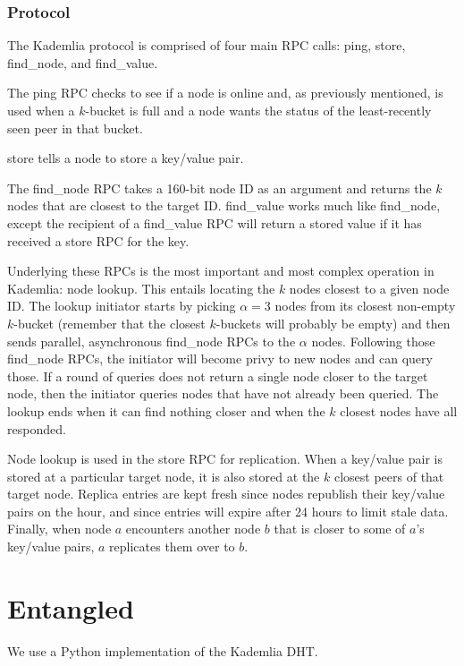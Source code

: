 \documentclass[12pt,twocolumn]{article}
\begin{document}
\subsubsection{Protocol}
\newcommand{\findNode}{}
\def\findNode/{{\sc find\_node}}
\newcommand{\findValue}{}
\def\findValue/{{\sc find\_value}}
\newcommand{\ping}{}
\def\ping/{{\sc ping}}
\newcommand{\store}{}
\def\store/{{\sc store}}

The Kademlia protocol is comprised of four main RPC calls: \ping/, \store/, \findNode/, and \findValue/.

The \ping/ RPC checks to see if a node is online and, as previously mentioned, is used when a $k$-bucket is full and a node wants the status of the least-recently seen peer in that bucket.

\store/ tells a node to store a key/value pair.

The \findNode/ RPC takes a 160-bit node ID as an argument and returns the $k$ nodes that are closest to the target ID. \findValue/ works much like \findNode/, except the recipient of a \findValue/ RPC will return a stored value if it has received a \store/ RPC for the key.

Underlying these RPCs is the most important and most complex operation in Kademlia: node lookup. This entails locating the $k$ nodes closest to a given node ID. The lookup initiator starts by picking $\alpha = 3$ nodes from its closest non-empty $k$-bucket (remember that the closest $k$-buckets will probably be empty) and then sends parallel, asynchronous \findNode/ RPCs to the $\alpha$ nodes. Following those \findNode/ RPCs, the initiator will become privy to new nodes and can query those. If a round of queries does not return a single node closer to the target node, then the initiator queries nodes that have not already been queried. The lookup ends when it can find nothing closer and when the $k$ closest nodes have all responded.

Node lookup is used in the \store/ RPC for replication. When a key/value pair is stored at a particular target node, it is also stored at the $k$ closest peers of that target node. Replica entries are kept fresh since nodes republish their key/value pairs on the hour, and since entries will expire after 24 hours to limit stale data. Finally, when node $a$ encounters another node $b$ that is closer to some of $a$'s key/value pairs, $a$ replicates them over to $b$.

\section{Entangled}
We use a Python implementation of the Kademlia DHT.
\end{document}
